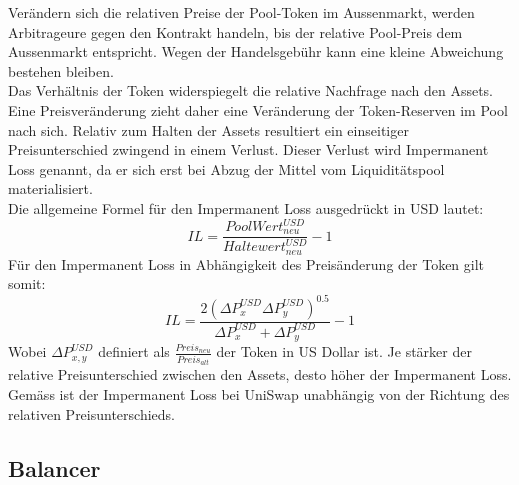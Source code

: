 \documentclass[12pt,a4paper,titlepage,oneside,english]{article}
\begin{document}
Verändern sich die relativen Preise der Pool-Token im Aussenmarkt, werden Arbitrageure gegen den Kontrakt handeln, bis der relative Pool-Preis dem Aussenmarkt entspricht. Wegen der Handelsgebühr kann eine kleine Abweichung bestehen bleiben. \citep[vgl.][S.4f.]{Angeris2019} \\
Das Verhältnis der Token widerspiegelt die relative Nachfrage nach den Assets. Eine Preisveränderung zieht daher eine Veränderung der Token-Reserven im Pool nach sich. 
Relativ zum Halten der Assets resultiert ein einseitiger Preisunterschied zwingend in einem Verlust. Dieser Verlust wird Impermanent Loss genannt, da er sich erst bei Abzug der Mittel vom Liquiditätspool materialisiert. \citep{Pintail2019}\\
Die allgemeine Formel für den Impermanent Loss ausgedrückt in USD lautet: \citep{Martinelli2020}
\begin{equation}
IL = \dfrac{Pool Wert^{USD}_{neu}}{Haltewert^{USD}_{neu}}-1 \label{eq:8}
\end{equation}
Für den Impermanent Loss in Abhängigkeit des Preisänderung der Token gilt somit: \citep{Martinelli2020} %
\begin{equation}
IL =\dfrac{2 (\Delta P^{USD}_{x} \Delta P^{USD}_{y})^{0.5}}{\Delta P^{USD}_{x}+\Delta P^{USD}_{y}}-1 \label{eq:9}
\end{equation}
Wobei $\Delta P_{x,y}^{USD}$ definiert als $\tfrac{Preis_{neu}}{Preis_{alt}}$ der Token in US Dollar ist. Je stärker der relative Preisunterschied zwischen den Assets, desto höher der Impermanent Loss. Gemäss \cite{Pintail2019} ist der Impermanent Loss bei UniSwap unabhängig von der Richtung des relativen Preisunterschieds. %
\citep{Pintail2019}


\subsection{Balancer}
\end{document}
